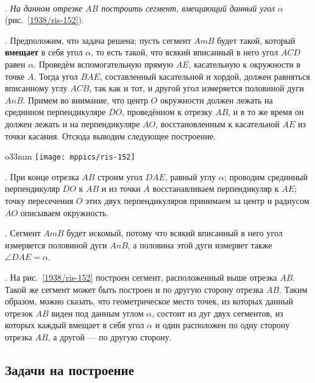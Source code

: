 \paragraph{}\label{1938/132}
\mbox{.}
\emph{На данном отрезке $AB$ построить сегмент, вмещающий данный угол $\alpha$} (рис.~\ref{1938/ris-152}).

\smallskip
\mbox{.}
Предположим, что задача решена;
пусть сегмент $AmB$ будет такой, который \textbf{вмещает} в себя угол $\alpha$, то есть такой, что всякий вписанный в него угол $ACD$ равен $\alpha$.
Проведём вспомогательную прямую $AE$, касательную к окружности в точке $A$.
Тогда угол $BAE$, составленный касательной и хордой, должен равняться вписанному углу $ACB$, так как и тот, и другой угол измеряется половиной дуги $AnB$.
Примем во внимание, что центр $O$ окружности должен лежать на срединном перпендикуляре $DO$, проведённом к отрезку $AB$, и в то же время он должен лежать и на перпендикуляре $AO$, восстановленным к касательной $AE$ из точки касания.
Отсюда выводим следующее построение.

\begin{wrapfigure}{o}{33mm}
\centering
\texttt{[image: mppics/ris-152]}
\caption{}\label{1938/ris-152}
\end{wrapfigure}

\smallskip
\mbox{.}
При конце отрезка $AB$ строим угол $DAE$, равный углу $\alpha$;
проводим срединный перпендикуляр $DO$ к $AB$ и из точки $A$ восстанавливаем перпендикуляр к $AE$; 
точку пересечения $O$ этих двух перпендикуляров принимаем за центр и радиусом $AO$ описываем окружность.

\smallskip
\mbox{.}
Сегмент $AmB$ будет искомый, потому что всякий вписанный в него угол измеряется половиной дуги $AnB$, а половина этой дуги измеряет также $\angle DAE=\alpha$.

{\small
\smallskip
\mbox{.}
На рис.~\ref{1938/ris-152} построен сегмент, расположенный выше отрезка $AB$.
Такой же сегмент может быть построен и по другую сторону отрезка $AB$.
Таким образом, можно сказать, что геометрическое место точек, из которых данный отрезок $AB$ виден под данным углом $\alpha$, состоит из дуг двух сегментов, из которых каждый вмещает в себя угол $\alpha$ и один расположен по одну сторону отрезка $AB$, а другой — по другую сторону.

}

\subsection*{Задачи на построение}

